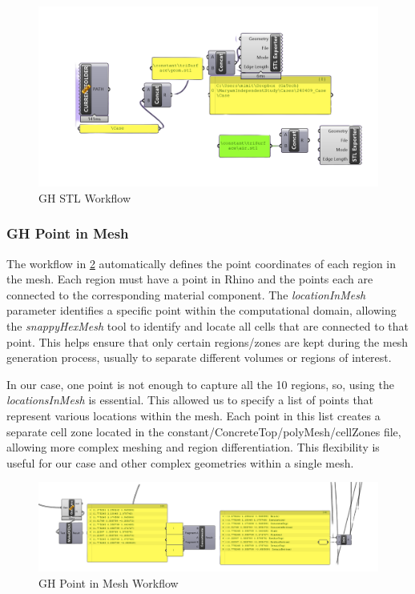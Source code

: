 \begin{figure}[tbh]
\centering
\includegraphics[width=0.77\columnwidth]{Figures/stlgh.png}
\hspace{0.7cm}
\caption{GH STL Workflow}
\label{stlgh}
\end{figure}



\subsubsection{GH Point in Mesh}
The workflow in \ref{locgh} automatically defines the point coordinates of each region in the mesh. Each region must have a point in Rhino and the points each are connected to the corresponding material component. The \textit{locationInMesh} parameter identifies a specific point within the computational domain, allowing the \textit{snappyHexMesh} tool to identify and locate all cells that are connected to that point. This helps ensure that only certain regions/zones are kept during the mesh generation process, usually to separate different volumes or regions of interest.

In our case, one point is not enough to capture all the 10 regions, so, using the \textit{locationsInMesh} is essential. This allowed us to specify a list of points that represent various locations within the mesh. Each point in this list creates a separate cell zone located in the constant/ConcreteTop/polyMesh/cellZones file, allowing more complex meshing and region differentiation. This flexibility is useful for our case and other complex geometries within a single mesh.

\begin{figure}[tbh]
\centering
\includegraphics[width=0.77\columnwidth]{Figures/locinmeshgh.png}
\hspace{0.7cm}
\caption{GH Point in Mesh Workflow}
\label{locgh}
\end{figure}






